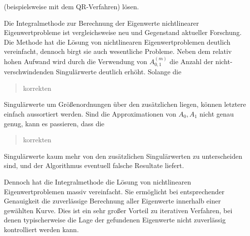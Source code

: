 (beispielsweise mit dem QR-Verfahren) lösen.

Die Integralmethode zur Berechnung der Eigenwerte nichtlinearer Eigenwertprobleme ist vergleichsweise neu und Gegenstand aktueller Forschung.
Die Methode hat die Lösung von nichtlinearen Eigenwertproblemen deutlich vereinfacht, dennoch birgt sie auch wesentliche Probleme.
Neben dem relativ hohen Aufwand wird durch die Verwendung von $A_{0, 1}^{(m)}$ die Anzahl der nicht-verschwindenden Singulärwerte deutlich erhöht.
Solange die \blockquote{korrekten} Singulärwerte um Größenordnungen über den zusätzlichen liegen, können letztere einfach aussortiert werden.
Sind die Approximationen von $A_0, A_1$ nicht genau genug, kann es passieren, dass die \blockquote{korrekten} Singulärwerte kaum mehr von den zusätzlichen Singulärwerten zu unterscheiden sind, und der Algorithmus eventuell falsche Resultate liefert.

Dennoch hat die Integralmethode die Lösung von nichtlinearen Eigenwertproblemen massiv vereinfacht.
Sie ermöglicht bei entsprechender Genauigkeit die zuverlässige Berechnung aller Eigenwerte innerhalb einer gewählten Kurve.
Dies ist ein sehr großer Vorteil zu iterativen Verfahren, bei denen typischerweise die Lage der gefundenen Eigenwerte nicht zuverlässig kontrolliert werden kann.
